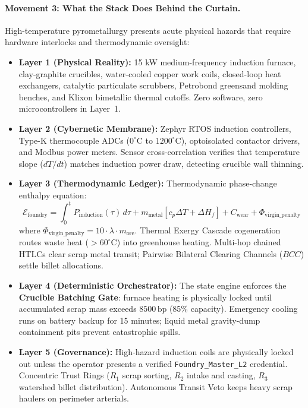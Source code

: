 \paragraph{Movement 3: What the Stack Does Behind the Curtain.}
High-temperature pyrometallurgy presents acute physical hazards that require hardware interlocks and thermodynamic oversight:
\begin{itemize}
    \item \textbf{Layer 1 (Physical Reality):} 15 kW medium-frequency induction furnace, clay-graphite crucibles, water-cooled copper work coils, closed-loop heat exchangers, catalytic particulate scrubbers, Petrobond greensand molding benches, and Klixon bimetallic thermal cutoffs. Zero software, zero microcontrollers in Layer~1.
    \item \textbf{Layer 2 (Cybernetic Membrane):} Zephyr RTOS induction controllers, Type-K thermocouple ADCs ($0^\circ\mathrm{C}$ to $1200^\circ\mathrm{C}$), optoisolated contactor drivers, and Modbus power meters. Sensor cross-correlation verifies that temperature slope ($dT/dt$) matches induction power draw, detecting crucible wall thinning.
    \item \textbf{Layer 3 (Thermodynamic Ledger):} Thermodynamic phase-change enthalpy equation:
    \[
    \mathcal{E}_{\mathrm{foundry}} = \int_{0}^{t} P_{\mathrm{induction}}(\tau) \, d\tau + m_{\mathrm{metal}} \left[ c_p \Delta T + \Delta H_f \right] + C_{\mathrm{wear}} + \Phi_{\mathrm{virgin\_penalty}}
    \]
    where $\Phi_{\mathrm{virgin\_penalty}} = 10 \cdot \lambda \cdot m_{\mathrm{ore}}$. Thermal Exergy Cascade cogeneration routes waste heat ($>60^\circ\mathrm{C}$) into greenhouse heating. Multi-hop chained HTLCs clear scrap metal transit; Pairwise Bilateral Clearing Channels ($BCC$) settle billet allocations.
    \item \textbf{Layer 4 (Deterministic Orchestrator):} The state engine enforces the \textbf{Crucible Batching Gate}: furnace heating is physically locked until accumulated scrap mass exceeds $8500\,\mathrm{bp}$ (85\% capacity). Emergency cooling runs on battery backup for 15 minutes; liquid metal gravity-dump containment pits prevent catastrophic spills.
    \item \textbf{Layer 5 (Governance):} High-hazard induction coils are physically locked out unless the operator presents a verified \texttt{Foundry\_Master\_L2} credential. Concentric Trust Rings ($R_1$ scrap sorting, $R_2$ intake and casting, $R_3$ watershed billet distribution). Autonomous Transit Veto keeps heavy scrap haulers on perimeter arterials.

\end{itemize}
